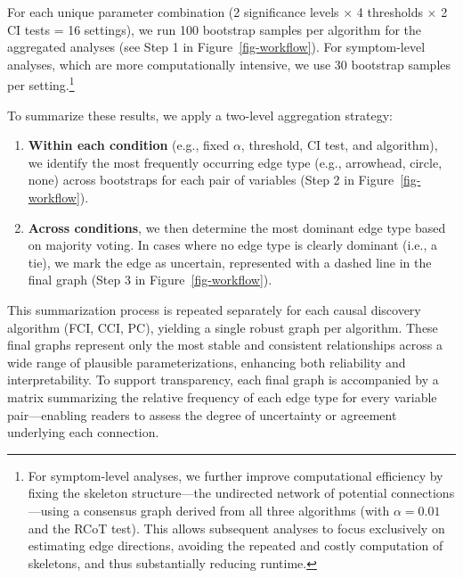 \documentclass[
]{article}
\providecommand{\tightlist}{%
  \setlength{\itemsep}{0pt}\setlength{\parskip}{0pt}}\usepackage{longtable,booktabs,array}
\begin{document}
For each unique parameter combination (2 significance levels × 4
thresholds × 2 CI tests = 16 settings), we run 100 bootstrap samples per
algorithm for the aggregated analyses (see Step 1 in
Figure~\ref{fig-workflow}). For symptom-level analyses, which are more
computationally intensive, we use 30 bootstrap samples per
setting.\footnote{For symptom-level analyses, we further improve
  computational efficiency by fixing the skeleton structure---the
  undirected network of potential connections---using a consensus graph
  derived from all three algorithms (with \(\alpha = 0.01\) and the RCoT
  test). This allows subsequent analyses to focus exclusively on
  estimating edge directions, avoiding the repeated and costly
  computation of skeletons, and thus substantially reducing runtime.}

To summarize these results, we apply a two-level aggregation strategy:

\begin{enumerate}
\def\labelenumi{\arabic{enumi}.}
\tightlist
\item
  \textbf{Within each condition} (e.g., fixed \(\alpha\), threshold, CI
  test, and algorithm), we identify the most frequently occurring edge
  type (e.g., arrowhead, circle, none) across bootstraps for each pair
  of variables (Step 2 in Figure~\ref{fig-workflow}).
\item
  \textbf{Across conditions}, we then determine the most dominant edge
  type based on majority voting. In cases where no edge type is clearly
  dominant (i.e., a tie), we mark the edge as uncertain, represented
  with a dashed line in the final graph (Step 3 in
  Figure~\ref{fig-workflow}).
\end{enumerate}

This summarization process is repeated separately for each causal
discovery algorithm (FCI, CCI, PC), yielding a single robust graph per
algorithm. These final graphs represent only the most stable and
consistent relationships across a wide range of plausible
parameterizations, enhancing both reliability and interpretability. To
support transparency, each final graph is accompanied by a matrix
summarizing the relative frequency of each edge type for every variable
pair---enabling readers to assess the degree of uncertainty or agreement
underlying each connection.
\end{document}
